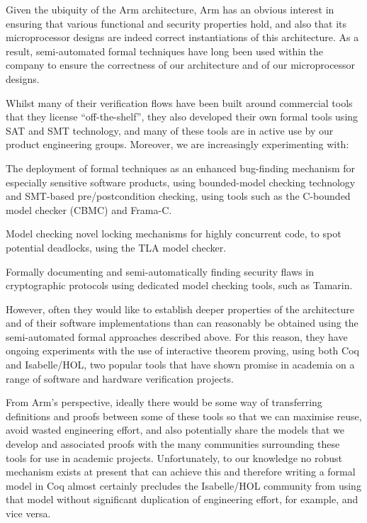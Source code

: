 {Given the ubiquity of the Arm architecture, Arm has an
obvious interest in ensuring that various functional and security
properties hold, and also that its microprocessor designs are indeed
correct instantiations of this architecture. As a result,
semi-automated formal techniques have long been used within the
company to ensure the correctness of our architecture and of our
microprocessor designs.

Whilst many of their verification flows have been built around
commercial tools that they license ``off-the-shelf'', they also
developed their own formal tools using SAT and SMT technology, and
many of these tools are in active use by our product engineering
groups. Moreover, we are increasingly experimenting with:

\begin{compactitem}
\item The deployment of formal techniques as an enhanced bug-finding
  mechanism for especially sensitive software products, using
  bounded-model checking technology and SMT-based pre/postcondition
  checking, using tools such as the C-bounded model checker (CBMC) and
  Frama-C.
\item Model checking novel locking mechanisms for highly concurrent
  code, to spot potential deadlocks, using the TLA model checker.
\item Formally documenting and semi-automatically finding security
  flaws in cryptographic protocols using dedicated model checking
  tools, such as Tamarin.
\end{compactitem}

However, often they would like to establish deeper properties of the
architecture and of their software implementations than can reasonably
be obtained using the semi-automated formal approaches described
above. For this reason, they have ongoing experiments with the use of
interactive theorem proving, using both Coq and Isabelle/HOL, two
popular tools that have shown promise in academia on a range of
software and hardware verification projects.

From Arm’s perspective, ideally there would be some way of
transferring definitions and proofs between some of these tools so
that we can maximise reuse, avoid wasted engineering effort, and also
potentially share the models that we develop and associated proofs
with the many communities surrounding these tools for use in academic
projects. Unfortunately, to our knowledge no robust mechanism exists
at present that can achieve this and therefore writing a formal model
in Coq almost certainly precludes the Isabelle/HOL community from
using that model without significant duplication of engineering
effort, for example, and vice versa.

}
